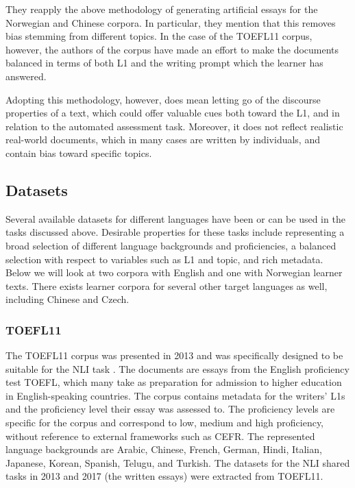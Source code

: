 They reapply the above methodology of generating artificial essays for the
Norwegian and Chinese corpora. In particular, they mention that this removes
bias stemming from different topics. In the case of the TOEFL11 corpus,
however, the authors of the corpus have made an effort to make the documents
balanced in terms of both L1 and the writing prompt which the learner has
answered.

Adopting this methodology, however, does mean letting go of the discourse
properties of a text, which could offer valuable cues both toward the L1, and
in relation to the automated assessment task. Moreover, it does not reflect
realistic real-world documents, which in many cases are written by
individuals, and contain bias toward specific topics.


\subsection{Datasets}

Several available datasets for different languages have been or can be used
in the tasks discussed above. Desirable properties for these tasks include
representing a broad selection of different language backgrounds and
proficiencies, a balanced selection with respect to variables such as L1 and
topic, and rich metadata. Below we will look at two corpora with English and
one with Norwegian learner texts. There exists learner corpora for several
other target languages as well, including Chinese and Czech.


\subsubsection{TOEFL11}

The TOEFL11 corpus was presented in 2013 and was specifically designed to be
suitable for the NLI task \autocite{blanchard13}. The documents are essays
from the English proficiency test TOEFL, which many take as preparation for
admission to higher education in English-speaking countries. The corpus
contains metadata for the writers' L1s and the proficiency level their essay
was assessed to. The proficiency levels are specific for the corpus and
correspond to low, medium and high proficiency, without reference to external
frameworks such as CEFR. The represented language backgrounds are Arabic,
Chinese, French, German, Hindi, Italian, Japanese, Korean, Spanish, Telugu,
and Turkish. The datasets for the NLI shared tasks in 2013 and 2017 (the
written essays) were extracted from TOEFL11.

